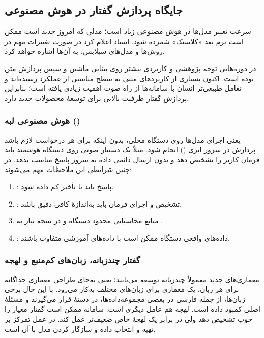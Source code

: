 \subsection{جایگاه پردازش گفتار در هوش مصنوعی}
سرعت تغییر مدل‌ها در هوش مصنوعی زیاد است؛ مدلی که امروز جدید است ممکن است ترم بعد «کلاسیک» شمرده شود. استاد اعلام کرد در صورت تغییرات مهم در روش‌ها و مدل‌های سیلابس، به آن‌ها اشاره خواهد کرد.

در دوره‌هایی توجه پژوهشی و کاربردی بیشتر روی بینایی ماشین و سپس پردازش متن بوده است. اکنون بسیاری از کاربردهای متنی به سطح مناسبی از عملکرد رسیده‌اند و تعامل طبیعی‌تر انسان با سامانه‌ها از راه صوت اهمیت زیادی یافته است؛ بنابراین پردازش گفتار ظرفیت بالایی برای توسعهٔ محصولات جدید دارد.

\subsubsection{هوش مصنوعی لبه ()}
 یعنی اجرای مدل‌ها روی دستگاه محلی، بدون اینکه برای هر درخواست لازم باشد پردازش در سرور ابری () انجام شود. مثلاً یک دستیار صوتی روی دستگاه هوشمند باید فرمان کاربر را تشخیص دهد و بدون ارسال دائمی داده به سرور پاسخ مناسب بدهد. در چنین شرایطی این ملاحظات مهم می‌شوند:
\begin{enumerate}
  \item {}: پاسخ باید با تأخیر کم داده شود.
  \item {}: تشخیص و اجرای فرمان باید به‌اندازهٔ کافی دقیق باشد.
  \item منابع محاسباتی محدود دستگاه و در نتیجه نیاز به .
  \item {}: داده‌های واقعی دستگاه ممکن است با داده‌های آموزشی متفاوت باشند.
\end{enumerate}

\subsubsection{گفتار چندزبانه، زبان‌های کم‌منبع و لهجه}
معماری‌های جدید معمولاً چندزبانه توسعه می‌یابند؛ یعنی به‌جای طراحی معماری جداگانه برای هر زبان، یک معماری برای زبان‌های مختلف به‌کار می‌رود. با این حال برخی زبان‌ها، از جمله فارسی در بعضی مجموعه‌داده‌ها، در دستهٔ  قرار می‌گیرند و مسئلهٔ اصلی کمبود داده است. لهجه هم عامل دیگری است: سامانه ممکن است گفتار معیار را خوب تشخیص دهد ولی در برابر یک لهجهٔ خاص ضعیف‌تر عمل کند. در عمل تمرکز بر تهیه و انتخاب داده و سازگار کردن مدل با آن است.

